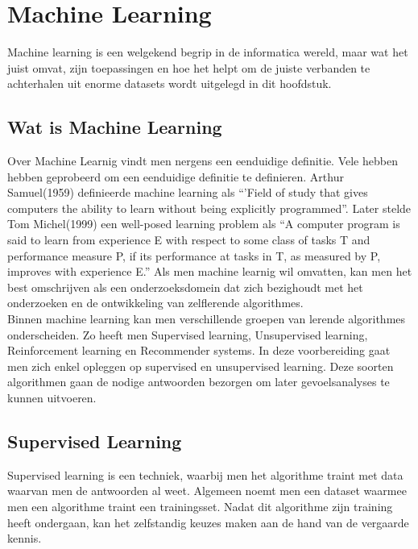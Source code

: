 \chapter{Machine Learning}\label{Machine Learning}

Machine learning is een welgekend begrip in de informatica wereld, maar wat het juist omvat, zijn toepassingen en hoe het helpt om de juiste verbanden te achterhalen uit enorme datasets wordt uitgelegd in dit hoofdstuk.

\section{Wat is Machine Learning}\label{Wat is Machine Learning}

Over Machine Learnig vindt men nergens een eenduidige definitie. Vele hebben hebben geprobeerd om een eenduidige definitie te definieren. Arthur Samuel(1959) definieerde machine learning als ``'Field of study that gives computers the ability to learn without being explicitly programmed''. Later stelde Tom Michel(1999) een well-posed learning problem als ``A computer program is said to learn from experience E with respect to some class of tasks T and performance measure P, if its performance at tasks in T, as measured by P, improves with experience E.'' Als men machine learnig wil omvatten, kan men het best omschrijven als een onderzoeksdomein dat zich bezighoudt met het onderzoeken en de ontwikkeling van zelflerende algorithmes.
\\
Binnen machine learning kan men verschillende groepen van lerende algorithmes onderscheiden. Zo heeft men Supervised learning, Unsupervised learning, Reinforcement learning en Recommender systems. In deze voorbereiding gaat men zich enkel opleggen op supervised en unsupervised learning. Deze soorten algorithmen gaan de nodige antwoorden bezorgen om later gevoelsanalyses te kunnen uitvoeren.


\section{Supervised Learning}\label{Supervised Learning}

Supervised learning is een techniek, waarbij men het algorithme traint met data waarvan men de antwoorden al weet. Algemeen noemt men een dataset waarmee men een algorithme traint een trainingsset. Nadat dit algorithme zijn training heeft ondergaan, kan het zelfstandig keuzes maken aan de hand van de vergaarde kennis.

